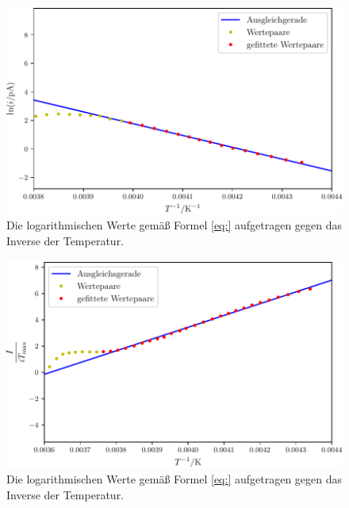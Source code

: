 \begin{figure}
	\centering
	\includegraphics[width=\linewidth-60pt,height=\textheight-60pt,keepaspectratio]{content/images/W2_1.pdf}
	\caption{Die logarithmischen Werte gemäß Formel \eqref{eq:} aufgetragen gegen das Inverse der Temperatur.}
	\label{fig:W2_1}
\end{figure}

\begin{figure}
	\centering
	\includegraphics[width=\linewidth-60pt,height=\textheight-60pt,keepaspectratio]{content/images/W2_2.pdf}
	\caption{Die logarithmischen Werte gemäß Formel \eqref{eq:} aufgetragen gegen das Inverse der Temperatur.}
	\label{fig:W2_2}
\end{figure}

%	
